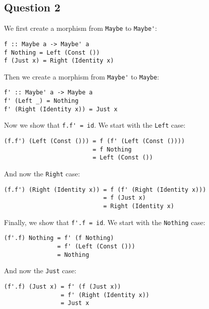 \subsection{Question 2}
We first create a morphism from \lstinline{Maybe} to \lstinline{Maybe'}:

\begin{lstlisting}
f :: Maybe a -> Maybe' a
f Nothing = Left (Const ())
f (Just x) = Right (Identity x)
\end{lstlisting}

Then we create a morphism from \lstinline{Maybe'} to \lstinline{Maybe}:

\begin{lstlisting}
f' :: Maybe' a -> Maybe a
f' (Left _) = Nothing
f' (Right (Identity x)) = Just x
\end{lstlisting}

Now we show that \lstinline{f.f' = id}. We start with the \lstinline{Left} case:

\begin{lstlisting}
(f.f') (Left (Const ())) = f (f' (Left (Const ())))
                         = f Nothing
                         = Left (Const ())
\end{lstlisting}

And now the \lstinline{Right} case:

\begin{lstlisting}
(f.f') (Right (Identity x)) = f (f' (Right (Identity x)))
                            = f (Just x)
                            = Right (Identity x)
\end{lstlisting}

Finally, we show that \lstinline{f'.f = id}. We start with the
\lstinline{Nothing} case:

\begin{lstlisting}
(f'.f) Nothing = f' (f Nothing)
               = f' (Left (Const ()))
               = Nothing
\end{lstlisting}

And now the \lstinline{Just} case:

\begin{lstlisting}
(f'.f) (Just x) = f' (f (Just x))
                = f' (Right (Identity x))
                = Just x
\end{lstlisting}

